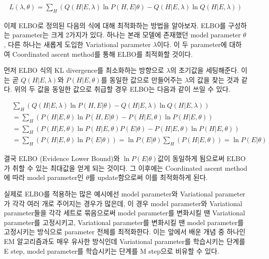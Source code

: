 \documentclass[draft=false]{oblivoir}
\begin{document}
\begin{eqnarray}
L(\lambda,\theta) = \sum_{H} \left( Q(H|E,\lambda) \ln P(H,E|\theta) - Q(H|E,\lambda) \ln Q(H|E,\lambda)\right)
\label{eq:Q()11-2-5-1}
\end{eqnarray}

이제 ELBO로 정의된 다음의 식에 대해 최적화하는 방법을 알아보자. ELBO를 구성하는 parameter는 크게 2가지가 있다. 하나는 본래 모델에 존재했던 model parameter $\theta$, 다른 하나는 새롭게 도입한 Variational parameter $\lambda$이다. 이 두 parameter에 대하여 Coordinated ascent method를 통해 ELBO를 최적화할 것이다.  

먼저 ELBO 식의 KL divergence를 최소화하는 방향으로 $\lambda$의 초기값을 세팅해준다. 이는 곧 $Q(H|E,\lambda)$와 $P(H|E,\theta)$를 동일한 값으로 만들어주는 $\lambda$의 값을 찾는 것과 같다. 위의 두 값을 동일한 값으로 취급할 경우 ELBO는 다음과 같이 쓰일 수 있다. 

\begin{align}
&\sum_{H} \left( Q(H|E,\lambda) \ln P(H,E|\theta) - Q(H|E,\lambda) \ln Q(H|E,\lambda)\right)\nonumber\\
 & = \sum_{H} \left( P(H|E,\theta)\ln P(H,E|\theta) -  P(H|E,\theta)\ln  P(H|E,\theta)\right)\nonumber\\
 & = \sum_{H} \left( P(H|E,\theta)\ln P(H|E,\theta)P(E|\theta) -  P(H|E,\theta)\ln  P(H|E,\theta)\right)\nonumber\\
 & = \sum_{H} \left( P(H|E,\theta)\ln P(E|\theta)\right)
 = \ln P(E|\theta)\sum_{H} \left( P(H|E,\theta)\right)
 = \ln P(E|\theta)
\label{eq:Q()11-2-5-2}
\end{align}

결국 ELBO (Evidence Lower Bound)와 $ \ln P(E|\theta)$값이 동일하게 됨으로써 ELBO가 취할 수 있는 최대값을 얻게 되는 것이다. 그 이후에는 Coordinated ascent method에 따라 model parameter인  $\theta$를 update함으로써 이를 최적화하게 된다. 

실제로 ELBO를 적용하는 많은 예시에선 model parameter와 Variational parameter가 각각 여러 개로 주어지는 경우가 많은데, 이 경우 model parameter와 Variational parameter들을 각각 세트로 묶음으로써 model parameter를 변화시킬 땐 Variational parameter를 고정시키고, Variational parameter를 변화시킬 땐 model parameter를 고정시키는 방식으로 parameter 전체를 최적화한다. 이는 앞에서 배운 개념 중 하나인 EM 알고리즘과도 매우 유사한 방식인데 Variational parameter를 학습시키는 단계를 E step, model parameter를 학습시키는 단계를 M step으로 비유할 수 있다. 


\end{document}
